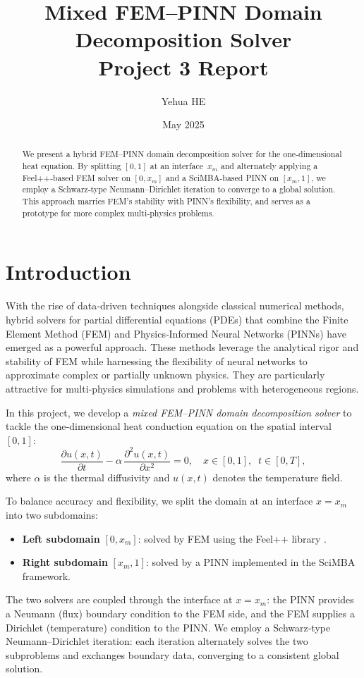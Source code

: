 \documentclass[12pt]{article}
\title{Mixed FEM–PINN Domain Decomposition Solver\\Project 3 Report}
\author{Yehua HE}
\date{May 2025}
\begin{document}
\maketitle
\begin{abstract}
We present a hybrid FEM–PINN domain decomposition solver for the one‐dimensional heat equation. By splitting $[0,1]$ at an interface~$x_m$ and alternately applying a Feel++‐based FEM solver on $[0,x_m]$ and a SciMBA‐based PINN on $[x_m,1]$, we employ a Schwarz‐type Neumann–Dirichlet iteration to converge to a global solution. This approach marries FEM’s stability with PINN’s flexibility, and serves as a prototype for more complex multi‐physics problems.
\end{abstract}

\tableofcontents

\newpage

\section{Introduction}

With the rise of data‐driven techniques alongside classical numerical methods, hybrid solvers for partial differential equations (PDEs) that combine the Finite Element Method (FEM) and Physics‐Informed Neural Networks (PINNs) have emerged as a powerful approach\cite{raissi_physics-informed_2019,grossmann_can_2024}. These methods leverage the analytical rigor and stability of FEM while harnessing the flexibility of neural networks to approximate complex or partially unknown physics\cite{raissi_physics-informed_2019,cai_physics-informed_2021}. They are particularly attractive for multi‐physics simulations and problems with heterogeneous regions\cite{cai_physics-informed_2021}.

In this project, we develop a \emph{mixed FEM–PINN domain decomposition solver} to tackle the one‐dimensional heat conduction equation on the spatial interval $[0,1]$:
\begin{equation}
  \frac{\partial u(x,t)}{\partial t}
  - \alpha\,\frac{\partial^2 u(x,t)}{\partial x^2}
  = 0,
  \quad x \in [0,1],\;\; t \in [0,T],
\end{equation}
where $\alpha$ is the thermal diffusivity and $u(x,t)$ denotes the temperature field.

To balance accuracy and flexibility, we split the domain at an interface $x = x_m$ into two subdomains:
\begin{itemize}
  \item \textbf{Left subdomain} $[0,x_m]$: solved by FEM using the Feel++ library \cite{noauthor_feelppfeelpp_nodate}.
  \item \textbf{Right subdomain} $[x_m,1]$: solved by a PINN implemented in the SciMBA \cite{noauthor_scimba_nodate} framework.
\end{itemize}
The two solvers are coupled through the interface at $x = x_m$: the PINN provides a Neumann (flux) boundary condition to the FEM side, and the FEM supplies a Dirichlet (temperature) condition to the PINN. We employ a Schwarz‐type Neumann–Dirichlet iteration: each iteration alternately solves the two subproblems and exchanges boundary data, converging to a consistent global solution.
\end{document}
